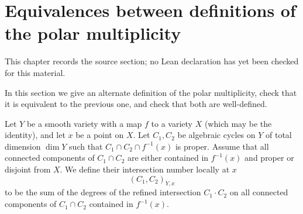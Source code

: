 \chapter{Equivalences between definitions of the polar multiplicity}
\label{bounds-stalks-perverse-sheaves-characteristic-p-shende-chapter-03}

\begin{remark}
\label{bounds-stalks-perverse-sheaves-characteristic-p-shende-chapter-03-source}
This chapter records the source section; no Lean declaration has yet been checked for this material.
\notready
\end{remark}

\label{equivalences}

In this section we give an alternate definition of the polar multiplicity, check that it is equivalent to the previous one, and check that both are well-defined.


\begin{defi}
\notready Let $Y$ be a smooth variety with a map $f$ to a variety $X$ (which may be the identity), and let $x$ be a point on $X$. Let $C_1, C_2$ be algebraic cycles on $Y$ of total dimension $\dim Y$ such that $C_1 \cap C_2 \cap f^{-1}(x)$ is proper. Assume that all connected components of $C_1 \cap C_2$ are either contained in $f^{-1}(x)$ and proper or disjoint from $X$. We define their intersection number locally at $x$  \[ (C_1,C_2)_{Y, x} \] to be the sum of the degrees of the refined intersection $C_1 \cdot C_2$ \cite[p. 131]{Fulton} on all connected components of $C_1 \cap C_2$ contained in $f^{-1}(x)$. \end{defi}


